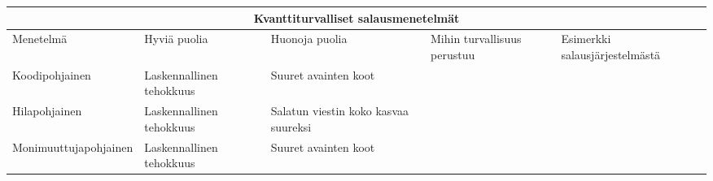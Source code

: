 \begin{tabular}{ |p{4cm}||p{4cm}|p{4cm}|p{4cm}|p{4cm}|  }
 \hline
 \multicolumn{5}{|c|}{Kvanttiturvalliset salausmenetelmät} \\
 \hline
 Menetelmä&Hyviä puolia&Huonoja puolia&Mihin turvallisuus perustuu&Esimerkki salausjärjestelmästä\\
 \hline
 Koodipohjainen & Laskennallinen tehokkuus & Suuret avainten koot \\
 \hline
 Hilapohjainen & Laskennallinen tehokkuus & Salatun viestin koko kasvaa suureksi \\
 \hline
 Monimuuttujapohjainen & Laskennallinen tehokkuus & Suuret avainten koot \\
 \hline
\end{tabular}